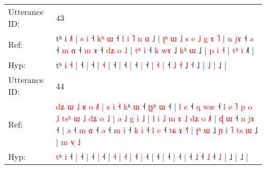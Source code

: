 \documentclass[10pt]{article}
\DeclareRobustCommand{\hl}[1]{{\textcolor{red}{#1}}}
\begin{document}
\begin{longtable}{ll}
 \\
\midrule
Utterance ID: & 43 \\
Ref: & tʰ i \hl{˩}\hl{˥} |\hl{ }\hl{s}\hl{ }\hl{i} ˧\hl{ }\hl{k}\hl{ʰ} \hl{ɯ} ˧\hl{ }\hl{l}\hl{ }\hl{i}\hl{ }\hl{˥}\hl{ }\hl{n}\hl{ }\hl{ɑ}\hl{ }\hl{˩} |\hl{ }\hl{ʈ}\hl{ʰ}\hl{ }\hl{ɯ}\hl{ }\hl{˩}\hl{ }\hl{s}\hl{ }\hl{e}\hl{ }\hl{˩}\hl{ }\hl{g}\hl{ }\hl{ɤ} \hl{˥} |\hl{ }\hl{n}\hl{ }\hl{j}\hl{ɤ} ˧ \hl{ə} ˧\hl{ }\hl{m} \hl{ɑ} ˧\hl{ }\hl{m} \hl{ɤ} ˧\hl{ }\hl{d}\hl{ʑ}\hl{ }\hl{o}\hl{ }\hl{˩} | \hl{t}\hl{ʰ} \hl{i} ˧ \hl{k} \hl{w}\hl{ɤ} ˩\hl{ }\hl{k}\hl{ʰ} \hl{ɯ} ˩ |\hl{ }\hl{p}\hl{ }\hl{i} \hl{˧} |\hl{ }\hl{t}\hl{ʰ}\hl{ }\hl{i} ˩\hl{˥} |
 \\
Hyp: & tʰ i \hl{}\hl{˧} |\hl{}\hl{}\hl{}\hl{} ˧\hl{}\hl{}\hl{} \hl{|} ˧\hl{}\hl{}\hl{}\hl{}\hl{}\hl{}\hl{}\hl{}\hl{}\hl{}\hl{}\hl{} |\hl{}\hl{}\hl{}\hl{}\hl{}\hl{}\hl{}\hl{}\hl{}\hl{}\hl{}\hl{}\hl{}\hl{}\hl{}\hl{}\hl{} \hl{˧} |\hl{}\hl{}\hl{}\hl{}\hl{} ˧ \hl{|} ˧\hl{}\hl{} \hl{|} ˧\hl{}\hl{} \hl{|} ˧\hl{}\hl{}\hl{}\hl{}\hl{}\hl{}\hl{} | \hl{}\hl{˧} \hl{|} ˧ \hl{˩} \hl{}\hl{˧} ˩\hl{}\hl{}\hl{} \hl{˧} ˩ |\hl{}\hl{}\hl{}\hl{} \hl{˩} |\hl{}\hl{}\hl{}\hl{}\hl{} ˩\hl{} |
 \\
\midrule
Utterance ID: & 44 \\
Ref: & \hl{d}\hl{ʑ}\hl{ }\hl{ɯ}\hl{ }\hl{˩}\hl{ }\hl{ʁ}\hl{ }\hl{o}\hl{ }\hl{˩}\hl{˥}\hl{ }\hl{|}\hl{ }\hl{s}\hl{ }\hl{i}\hl{ }\hl{˧}\hl{ }\hl{k}ʰ \hl{ɯ} ˧\hl{ }\hl{ʈ}\hl{ʂ}\hl{ʰ} \hl{ɯ} ˧ |\hl{ }\hl{l}\hl{ }\hl{e} ˧\hl{ }\hl{q} \hl{w}\hl{æ} ˧\hl{ }\hl{l}\hl{ }\hl{e}\hl{ }\hl{˥}\hl{ }\hl{p}\hl{ }\hl{o}\hl{ }\hl{˩}\hl{ }\hl{t}\hl{s}\hl{ʰ}\hl{ }\hl{ɯ}\hl{ }\hl{˩}\hl{ }\hl{d}\hl{ʑ}\hl{ }\hl{o}\hl{ }\hl{˩} |\hl{ }\hl{ə}\hl{ }\hl{˩}\hl{ }\hl{g}\hl{ }\hl{i} \hl{˩} |\hl{ }\hl{l}\hl{ }\hl{i}\hl{ }\hl{˩}\hl{ }\hl{m}\hl{ }\hl{ɤ}\hl{ }\hl{˩}\hl{ }\hl{d}\hl{ʑ}\hl{ }\hl{o} \hl{˩}\hl{˥} |\hl{ }\hl{ɖ}\hl{ }\hl{ɯ} ˧\hl{ }\hl{n} \hl{j}\hl{ɤ} ˧ |\hl{ }\hl{ə} ˧\hl{ }\hl{m} \hl{ɑ} ˧ \hl{ə} ˧\hl{ }\hl{m} \hl{i} ˧\hl{ }\hl{k} \hl{i} ˧\hl{ }\hl{l} \hl{e} ˧\hl{ }\hl{t}\hl{ɕ}\hl{ }\hl{ɤ} \hl{˧}\hl{˥} |\hl{ }\hl{ʈ}\hl{ʰ}\hl{ }\hl{ɯ} ˩\hl{ }\hl{ɲ}\hl{ }\hl{i}\hl{ }\hl{˥}\hl{ }\hl{t}\hl{s} \hl{ɯ} ˩ |\hl{ }\hl{m}\hl{ }\hl{v}\hl{̩}\hl{ }\hl{˩}
 \\
Hyp: & \hl{}\hl{}\hl{}\hl{}\hl{}\hl{}\hl{}\hl{}\hl{}\hl{}\hl{}\hl{}\hl{}\hl{}\hl{}\hl{}\hl{}\hl{}\hl{}\hl{}\hl{}\hl{}\hl{t}ʰ \hl{i} ˧\hl{}\hl{}\hl{}\hl{} \hl{|} ˧ |\hl{}\hl{}\hl{}\hl{} ˧\hl{}\hl{} \hl{}\hl{|} ˧\hl{}\hl{}\hl{}\hl{}\hl{}\hl{}\hl{}\hl{}\hl{}\hl{}\hl{}\hl{}\hl{}\hl{}\hl{}\hl{}\hl{}\hl{}\hl{}\hl{}\hl{}\hl{}\hl{}\hl{}\hl{}\hl{}\hl{} |\hl{}\hl{}\hl{}\hl{}\hl{}\hl{}\hl{}\hl{} \hl{˧} |\hl{}\hl{}\hl{}\hl{}\hl{}\hl{}\hl{}\hl{}\hl{}\hl{}\hl{}\hl{}\hl{}\hl{}\hl{}\hl{}\hl{} \hl{}\hl{˧} |\hl{}\hl{}\hl{}\hl{} ˧\hl{}\hl{} \hl{}\hl{|} ˧ |\hl{}\hl{} ˧\hl{}\hl{} \hl{|} ˧ \hl{|} ˧\hl{}\hl{} \hl{|} ˧\hl{}\hl{} \hl{˩} ˧\hl{}\hl{} \hl{˩} ˧\hl{}\hl{}\hl{}\hl{}\hl{} \hl{}\hl{˩} |\hl{}\hl{}\hl{}\hl{}\hl{} ˩\hl{}\hl{}\hl{}\hl{}\hl{}\hl{}\hl{}\hl{}\hl{} \hl{|} ˩ |\hl{}\hl{}\hl{}\hl{}\hl{}\hl{}\hl{}

\end{longtable}
\end{document}

